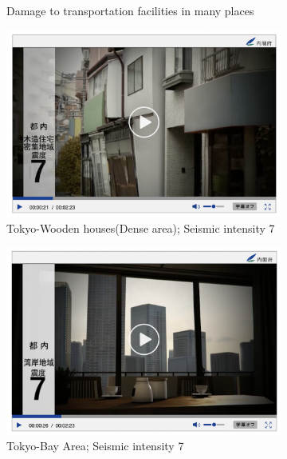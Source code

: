 \begin{figure}[h]
\begin{subfigure}{0.32\textwidth}
    \caption{Damage to transportation facilities in many places}
    \label{fig5c}
  \end{subfigure}\hfill
  \begin{subfigure}{0.32\textwidth}
    \centering
    \includegraphics[width=\linewidth]{Figure/Figure5d.jpg}
    \caption{Tokyo-Wooden houses(Dense area); Seismic intensity 7}
    \label{fig5d}
  \end{subfigure}\hfill
  \begin{subfigure}{0.32\textwidth}
    \centering
    \includegraphics[width=\linewidth]{Figure/Figure5e.jpg}
    \caption{Tokyo-Bay Area; Seismic intensity 7}
    \label{fig5e}
  \end{subfigure}\hfill
  \begin{subfigure}{0.32\textwidth}
    \centering

\end{subfigure}
\end{figure}
